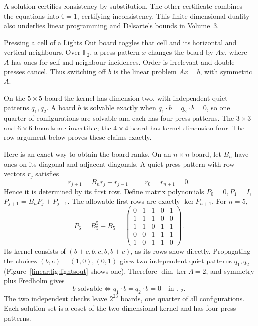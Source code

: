 A solution certifies consistency by substitution. The other certificate combines the equations into $0=1$, certifying inconsistency. This finite-dimensional duality also underlies linear programming and Delsarte's bounds in Volume~3.
\begin{example}\label{linear:ex:lightsout}
Pressing a cell of a Lights Out board toggles that cell and its horizontal and vertical neighbours. Over $\mathbb F_2$, a press pattern $x$ changes the board by $Ax$, where $A$ has ones for self and neighbour incidences. Order is irrelevant and double presses cancel. Thus switching off $b$ is the linear problem $Ax=b$, with symmetric $A$.

On the $5\times5$ board the kernel has dimension two, with independent quiet patterns $q_1,q_2$. A board $b$ is solvable exactly when $q_1\cdot b=q_2\cdot b=0$, so one quarter of configurations are solvable and each has four press patterns. The $3\times3$ and $6\times6$ boards are invertible; the $4\times4$ board has kernel dimension four. The row argument below proves these claims exactly.
\end{example}

Here is an exact way to obtain the board ranks. On an $n\times n$ board, let $B_n$ have ones on its diagonal and adjacent diagonals. A quiet press pattern with row vectors $r_j$ satisfies
\[r_{j+1}=B_nr_j+r_{j-1},\qquad r_0=r_{n+1}=0.
\]
Hence it is determined by its first row. Define matrix polynomials $P_0=0,P_1=I$, $P_{j+1}=B_nP_j+P_{j-1}$. The allowable first rows are exactly $\ker P_{n+1}$. For $n=5$,
\[P_6=B_5^5+B_5=
\begin{pmatrix}0&1&1&0&1\\1&1&1&0&0\\1&1&0&1&1\\0&0&1&1&1\\1&0&1&1&0\end{pmatrix}.
\]
Its kernel consists of $(b+c,b,c,b,b+c)$, as its rows show directly. Propagating the choices $(b,c)=(1,0),(0,1)$ gives two independent quiet patterns $q_1,q_2$ (Figure~\ref{linear:fig:lightsout} shows one). Therefore $\dim\ker A=2$, and symmetry plus Fredholm gives
\[b\text{ solvable}\iff q_1\cdot b=q_2\cdot b=0\quad\text{in }\mathbb F_2.
\]
The two independent checks leave $2^{23}$ boards, one quarter of all configurations. Each solution set is a coset of the two-dimensional kernel and has four press patterns.

